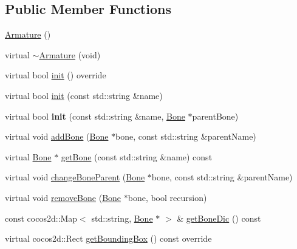 \subsection*{Public Member Functions}
\begin{DoxyCompactItemize}
\item 
\hyperlink{classcocostudio_1_1Armature_a718f247b339d19f4159b9abf847826aa}{Armature} ()
\item 
virtual \hyperlink{classcocostudio_1_1Armature_a3a94874b75c364d3cbfb604f1dd098c3}{$\sim$\+Armature} (void)
\item 
virtual bool \hyperlink{classcocostudio_1_1Armature_a8de388faf27f014c38aae2448f836fe2}{init} () override
\item 
virtual bool \hyperlink{classcocostudio_1_1Armature_af45353f74cf4d20d0d91e384029147e3}{init} (const std\+::string \&name)
\item 
\mbox{\label{classcocostudio_1_1Armature_a941cef9aef2589dee671b80d69cb4115}} 
virtual bool {\bfseries init} (const std\+::string \&name, \hyperlink{classcocostudio_1_1Bone}{Bone} $\ast$parent\+Bone)
\item 
virtual void \hyperlink{classcocostudio_1_1Armature_af7a204c1c43c67de2c29c9d3dff58c55}{add\+Bone} (\hyperlink{classcocostudio_1_1Bone}{Bone} $\ast$bone, const std\+::string \&parent\+Name)
\item 
virtual \hyperlink{classcocostudio_1_1Bone}{Bone} $\ast$ \hyperlink{classcocostudio_1_1Armature_aaf530de7857d358713da7c1ead1d7ee5}{get\+Bone} (const std\+::string \&name) const
\item 
virtual void \hyperlink{classcocostudio_1_1Armature_a993a948ec75aa9ebb41918babe51dc61}{change\+Bone\+Parent} (\hyperlink{classcocostudio_1_1Bone}{Bone} $\ast$bone, const std\+::string \&parent\+Name)
\item 
virtual void \hyperlink{classcocostudio_1_1Armature_a412c0baaf26ff1b635de8b426bb3ecae}{remove\+Bone} (\hyperlink{classcocostudio_1_1Bone}{Bone} $\ast$bone, bool recursion)
\item 
const cocos2d\+::\+Map$<$ std\+::string, \hyperlink{classcocostudio_1_1Bone}{Bone} $\ast$ $>$ \& \hyperlink{classcocostudio_1_1Armature_a46584bbc3ff6ae89dc94388d10cdd19a}{get\+Bone\+Dic} () const
\item 
virtual cocos2d\+::\+Rect \hyperlink{classcocostudio_1_1Armature_a9088f827e4dacfa6b06e86a7d7d0be36}{get\+Bounding\+Box} () const override
\item 
\mbox{\label{classcocostudio_1_1Armature_a84b93840fbbe3b09147ed0d494970746}} 

\end{DoxyCompactItemize}
